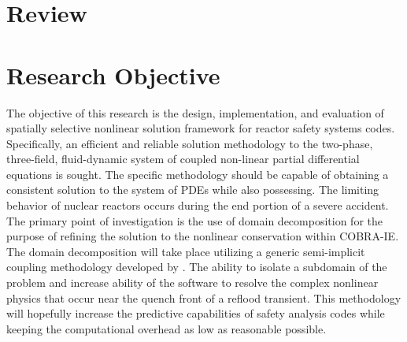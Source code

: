 \section{Review}
\label{sect:review}
\section{Research Objective}
The objective of this research is the design, implementation, and evaluation of spatially selective nonlinear solution framework for reactor safety systems codes.
Specifically, an efficient and reliable solution methodology to the two-phase, three-field, fluid-dynamic system of coupled non-linear partial differential equations is sought.
The specific methodology should be capable of obtaining a consistent solution to the system of PDEs while also possessing.
\cite{Aktas1996}
The limiting behavior of nuclear reactors occurs during the end portion of a severe accident.
The primary point of investigation is the use of domain decomposition for the purpose of refining the solution to the nonlinear conservation within COBRA-IE.
The domain decomposition will take place utilizing a generic semi-implicit coupling methodology developed by \citet{Weaver2002}.
The ability to isolate a subdomain of the problem and increase ability of the software to resolve the complex nonlinear physics that occur near the quench front of a reflood transient.
This methodology will hopefully increase the predictive capabilities of safety analysis codes while keeping the computational overhead as low as reasonable possible.